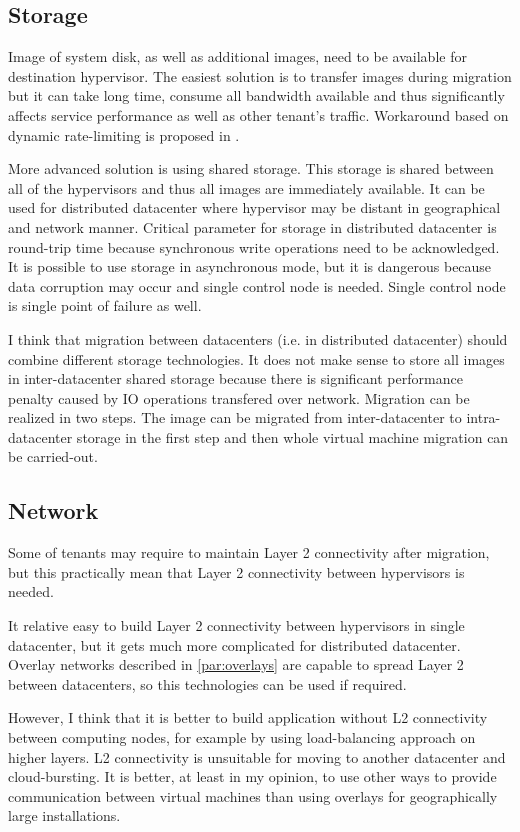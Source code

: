 \subsection{Storage}
Image of system disk, as well as additional images, need to be available for destination hypervisor. The easiest solution is to transfer images during migration but it can take long time, consume all bandwidth available and thus significantly affects service performance as well as other tenant's traffic. Workaround based on dynamic rate-limiting is proposed in \cite{live-migration-of-vms}.

More advanced solution is using shared storage. This storage is shared between all of the hypervisors and thus all images are immediately available. It can be used for distributed datacenter where hypervisor may be distant in geographical and network manner. Critical parameter for storage in distributed datacenter is round-trip time because synchronous write operations need to be acknowledged. It is possible to use storage in asynchronous mode, but it is dangerous because data corruption may occur and single control node is needed. Single control node is single point of failure as well. 

I think that migration between datacenters (i.e. in distributed datacenter) should combine different storage technologies. It does not make sense to store all images in inter-datacenter shared storage because there is significant performance penalty caused by \Ac{IO} operations transfered over network. Migration can be realized in two steps. The image can be migrated from inter-datacenter to intra-datacenter storage in the first step and then whole virtual machine migration can be carried-out.

\subsection{Network}
Some of tenants may require to maintain Layer 2 connectivity after migration, but this practically mean that Layer 2 connectivity between hypervisors is needed. 

It relative easy to build Layer 2 connectivity between hypervisors in single datacenter, but it gets much more complicated for distributed datacenter. Overlay networks described in \ref{par:overlays} are capable to spread Layer 2 between datacenters, so this technologies can be used if required. 

However, I think that it is better to build application without L2 connectivity between computing nodes, for example by using load-balancing approach on higher layers. L2 connectivity is unsuitable for moving to another datacenter and cloud-bursting. It is better, at least in my opinion, to use other ways to provide communication between virtual machines than using overlays for geographically large installations.

